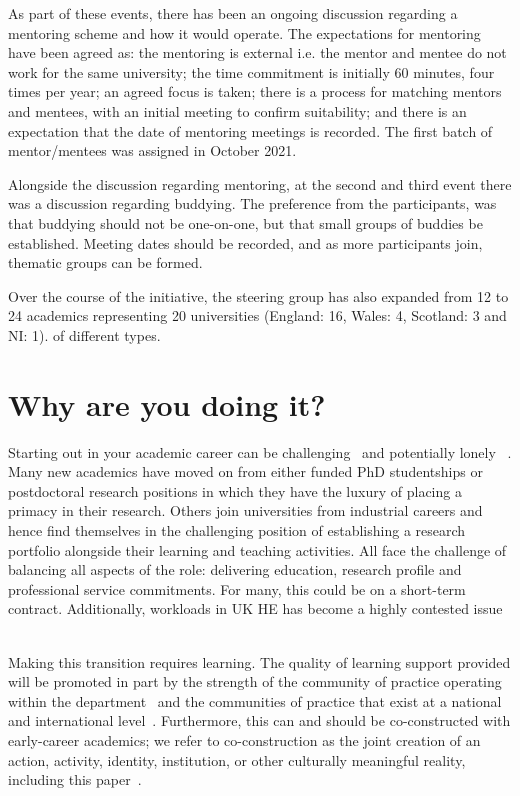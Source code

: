 \documentclass[sigconf]{acmart}
\begin{document}
As part of these events, there has been an ongoing discussion
regarding a mentoring scheme and how it would operate. The
expectations for mentoring have been agreed as: the mentoring is
external i.e. the mentor and mentee do not work for the same
university; the time commitment is initially 60 minutes, four times
per year; an agreed focus is taken; there is a process for
matching mentors and mentees, with an initial meeting to confirm
suitability; and there is an expectation that the date of mentoring
meetings is recorded. The first batch of mentor/mentees was assigned
in October 2021.

Alongside the discussion regarding mentoring, at the second and third
event there was a discussion regarding buddying. The preference from
the participants, was that buddying should not be one-on-one, but that
small groups of buddies be established. Meeting dates should be recorded, and as more participants join, thematic groups can be formed.

Over the course of the initiative, the steering group has also
expanded from 12 to 24 academics representing 20 universities (England: 16, Wales: 4, Scotland: 3 and NI: 1). of different types.

\section{Why are you doing it?}
\label{sec:Why}
Starting out in your academic career can be
challenging~\cite{Thomas2015} and potentially lonely
~\cite{Foote2009}. Many new academics have moved on from either funded
PhD studentships or postdoctoral research positions in which they have
the luxury of placing a primacy in their research. Others join
universities from industrial careers and hence find themselves in the
challenging position of establishing a research portfolio alongside
their learning and teaching activities. All face the challenge of balancing
all aspects of the role: delivering education, research profile and professional service commitments. For many, this could be on a short-term contract. Additionally, workloads in UK HE has become a highly contested issue ~\cite{UCU2016}

Making this transition requires learning. The quality of learning
support provided will be promoted in part by the strength of the
community of practice operating within the
department~\cite{Bolander2008} and the communities of practice that
exist at a national and international
level~\cite{Thomas2015}. Furthermore, this can and should be
co-constructed with early-career academics; we refer to
co-construction as the joint creation of an action, activity,
identity, institution, or other culturally meaningful
reality, including this paper~\cite{jacoby+ochs:1995}. 
\end{document}
